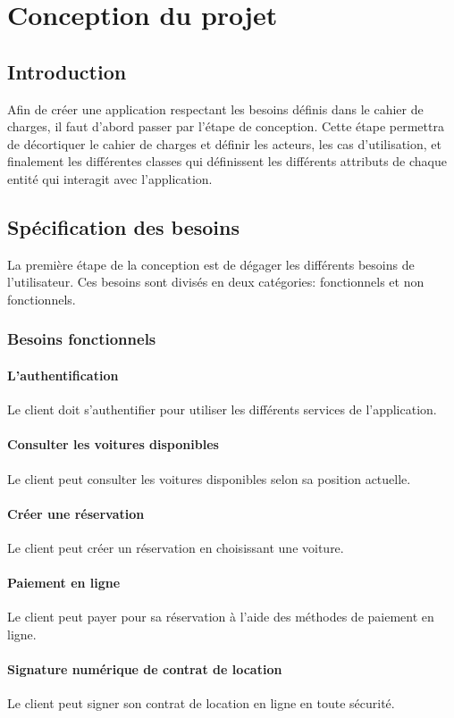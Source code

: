 \chapter{Conception du projet}
\minitoc
\clearpage
\section{Introduction}
Afin de créer une application respectant les besoins définis dans le cahier de charges, il faut d'abord passer par l'étape de conception. Cette étape permettra de décortiquer le cahier de charges et définir les acteurs, les cas d'utilisation, et finalement les différentes classes qui définissent les différents attributs de chaque entité qui interagit avec l'application.
\section{Spécification des besoins}
La première étape de la conception est de dégager les différents besoins de l'utilisateur. Ces besoins sont divisés en deux catégories: fonctionnels et non fonctionnels.
\subsection{Besoins fonctionnels}
\subsubsection{L'authentification}
Le client doit s'authentifier pour utiliser les différents services de l'application.
\subsubsection{Consulter les voitures disponibles}
Le client peut consulter les voitures disponibles selon sa position actuelle.
\subsubsection{Créer une réservation}
Le client peut créer un réservation en choisissant une voiture.
\subsubsection{Paiement en ligne}
Le client peut payer pour sa réservation à l'aide des méthodes de paiement en ligne.
\subsubsection{Signature numérique de contrat de location}
Le client peut signer son contrat de location en ligne en toute sécurité.
